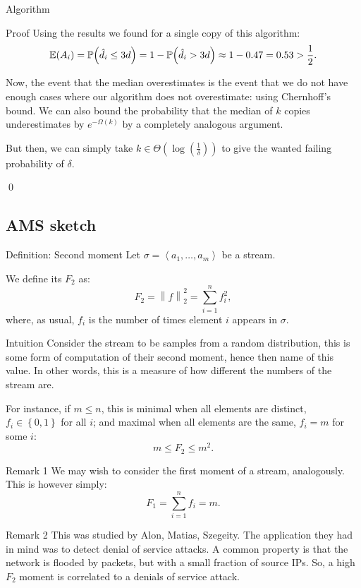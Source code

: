 \documentclass[a4paper]{article}
\begin{document}
\begin{parag}{Algorithm}
\begin{subparag}{Proof}
        Using the results we found for a single copy of this algorithm:
        \[\exval\left(A_i\right) = \prob\left(\hat{d}_i \leq 3d\right) = 1 - \prob\left(\hat{d}_i > 3d\right) \approx 1 - 0.47 = 0.53 > \frac{1}{2}.\]
        
        Now, the event that the median overestimates is the event that we do not have enough cases where our algorithm does not overestimate:
        using Chernhoff's bound. We can also bound the probability that the median of $k$ copies underestimates by $e^{- \Omega\left(k\right)}$ by a completely analogous argument.
        
        But then, we can simply take $k \in \Theta\left(\log\left(\frac{1}{\delta}\right)\right)$ to give the wanted failing probability of $\delta$.

        \qed
    \end{subparag}
\end{parag}

\subsection{AMS sketch}

\begin{parag}{Definition: Second moment}
    Let $\sigma = \left\langle a_1, \ldots, a_m \right\rangle$ be a stream.

    We define its  $F_2$ as: 
    \[F_2 = \left\|f\right\|_2^2 = \sum_{i=1}^{n} f_i^2,\]
    where, as usual, $f_i$ is the number of times element $i$ appears in $\sigma$.

    \begin{subparag}{Intuition}
        Consider the stream to be samples from a random distribution, this is some form of computation of their second moment, hence then name of this value. In other words, this is a measure of how different the numbers of the stream are.

        For instance, if $m \leq n$, this is minimal when all elements are distinct, $f_i \in \left\{0, 1\right\}$ for all $i$; and maximal when all elements are the same, $f_i = m$ for some $i$: 
        \[m \leq F_2 \leq m^2.\]
    \end{subparag}

    \begin{subparag}{Remark 1}
        We may wish to consider the first moment of a stream, analogously. This is however simply: 
        \[F_1 = \sum_{i=1}^{n} f_i = m.\]
    \end{subparag}

    \begin{subparag}{Remark 2}
        This was studied by Alon, Matias, Szegeity. The application they had in mind was to detect denial of service attacks. A common property is that the network is flooded by packets, but with a small fraction of source IPs. So, a high $F_2$ moment is correlated to a denials of service attack.
    \end{subparag}
\end{parag}
\end{document}
